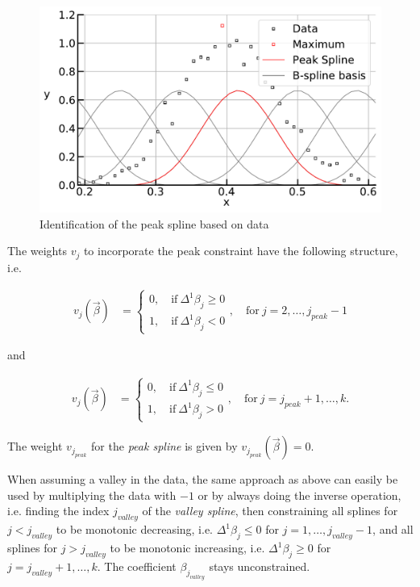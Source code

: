 \begin{figure}[H]
	\centering
	\includegraphics[width=\linewidth]{thesisplots/peak_spline.pdf}
	\caption{Identification of the peak spline based on data}
	\label{fig:peak_spline}
\end{figure}


The weights $v_j$ to incorporate the peak constraint have the following structure, i.e.

\begin{align}\label{eq:v_peak_1}
	v_j(\vec{\beta}) &= \begin{cases} 
		0, \quad \text{if} \ \Delta^1\beta_j \ge 0 \\ 
		1, \quad \text{if} \ \Delta^1\beta_j  < 0
	\end{cases}, \quad \text{for} \ j=2, \dots, j_{peak}-1
\end{align}

and 

\begin{align}\label{eq:v_peak_2}
	v_j(\vec{\beta}) &= \begin{cases} 
		0, \quad \text{if} \ \Delta^1\beta_j \le 0 \\ 
		1, \quad \text{if} \ \Delta^1\beta_j > 0
	\end{cases}, \quad \text{for} \ j=j_{peak}+1, \dots, k.
\end{align}

The weight $v_{j_{peak}}$ for the \emph{peak spline} is given by $v_{j_{peak}}(\vec{\beta}) = 0$. 

When assuming a valley in the data, the same approach as above can easily be used by multiplying the data with $-1$ or by always doing the inverse operation, i.e. finding the index $j_{valley}$ of the \emph{valley spline}, then constraining all splines for $j < j_{valley}$ to be monotonic decreasing, i.e. $\Delta^1 \beta_j \le 0$ for $j = 1, \dots, j_{valley}-1$, and all splines for $j > j_{valley}$ to be monotonic increasing, i.e. $\Delta^1 \beta_j \ge 0$ for $j = j_{valley}+1, \dots, k$. The coefficient $\beta_{j_{valley}}$ stays unconstrained. 


